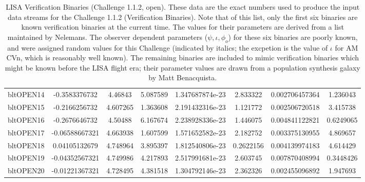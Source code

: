 \documentclass[11pt]{report}
\begin{document}
\begin{sidewaystable}
{\begin{tabular}{|l|c|c|c|c|c|c|c|}
bltOPEN14   & -0.3583376732   &      4.46843   &     5.087589   & 1.347687874e-23   &     2.833322   &  0.002706457364   &     1.236043\\
bltOPEN15   & -0.2166256732   &     4.607265   &     1.363608   & 2.191432316e-23   &     1.121772   &  0.002506720518   &     3.415738\\
bltOPEN16   & -0.2676646732   &      4.50488   &     6.167674   & 2.238928336e-23   &     1.446075   &  0.004841122821   &    0.6249065\\
bltOPEN17   &  -0.06588667321   &     4.663938   &     1.607599   & 1.571652582e-23   &     2.182752   &  0.003375130955   &     4.869657\\
bltOPEN18   & 0.04105132679   &     4.748964   &     3.895397   & 1.812540806e-23   &    0.2622156   &  0.004139974183   &     4.614429\\
bltOPEN19   &  -0.04352567321   &     4.749986   &     4.217893   & 2.517991681e-23   &     2.603745   &  0.007870408994   &    0.3448426\\
bltOPEN20   &  -0.01221367321   &     4.728495   &     4.381518   & 1.304792146e-23   &     2.362326   &  0.002455096892   &     1.947693\\
\hline
\end{tabular}
    \caption{LISA Verification Binaries (Challenge 1.1.2, open).  These data are the exact numbers
    used to produce the input data streams for the Challenge 1.1.2
    (Verification Binaries).  Note that of this list, only the first six
    binaries are known verification binaries at the current time.  The
    values for their parameters are derived from a list maintained by
    Nelemans\cite{NelemansWiki}.  The observer dependent parameters
    ($\psi, \iota, \phi_{o}$) for these six binaries are poorly known, and
    were assigned random values for this Challenge (indicated by italics; 
    the excpetion is the value of $\iota$ for AM CVn, which is reasonably 
    well known).  The remaining binaries are included to mimic
    verification binaries which might be known before the LISA flight era;
    their parameter values are drawn from a population synthesis galaxy by
    Matt Benacquista.}
\label{tbl.LISAbinaries1.1.2}
}
\end{sidewaystable}
\end{document}
